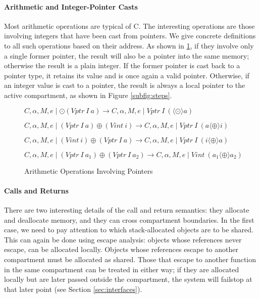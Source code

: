 \documentclass{article}
\begin{document}
\paragraph{Arithmetic and Integer-Pointer Casts}

Most arithmetic operations are typical of C. The interesting operations are those
involving integers that have been cast from pointers. We give concrete definitions
to all such operations based on their address. As shown in \ref{fig:arith}, if they
involve only a single former pointer, the result will also be a pointer into the
same memory; otherwise the result is a plain integer. If the former pointer is cast
back to a pointer type, it retains its value and is once again a valid pointer.
Otherwise, if an integer value is cast to a pointer, the result is always a local
pointer to the active compartment, as shown in Figure \ref{subfig:steps}.

\begin{figure}
  \judgment[Unop]
           {}
           {\(C,\alpha,M,e \mid \odot (\mathit{Vptr} ~ I ~ a) \longrightarrow
             C,\alpha,M,e \mid \mathit{Vptr} ~ I ~ (\langle \odot \rangle a)\)}
           
  \judgment[BinopPointerInteger]
           {}
           {\(C,\alpha,M,e \mid (\mathit{Vptr} ~ I ~ a) \oplus
             (\mathit{Vint} ~ i) \longrightarrow
             C,\alpha,M,e \mid \mathit{Vptr} ~ I ~ (a \langle \oplus \rangle i)\)}

  \judgment[BinopIntegerPointer]
           {}
           {\(C,\alpha,M,e \mid (\mathit{Vint} ~ i) \oplus
             (\mathit{Vptr} ~ I ~ a) \longrightarrow
           C,\alpha,M,e \mid \mathit{Vptr} ~ I ~ (i \langle \oplus \rangle a)\)}

  \judgment[BinopPointers]
           {}
           {\(C,\alpha,M,e \mid (\mathit{Vptr} ~ I ~ a_1) \oplus
             (\mathit{Vptr} ~ I ~ a_2) \longrightarrow
             C,\alpha,M,e \mid \mathit{Vint} ~ (a_1 \langle \oplus \rangle a_2)\)}

  \caption{Arithmetic Operations Involving Pointers}
  \label{fig:arith}
\end{figure}

\paragraph{Calls and Returns}

There are two interesting details of the call and return semantics:
they allocate and deallocate memory, and they can cross compartment boundaries.
In the first case, we need to pay attention to which stack-allocated
objects are to be shared. This can again be done using escape analysis:
objects whose references never escape, can be allocated locally. Objects whose
references escape to another compartment must be allocated as shared.
Those that escape to another function in the same compartment can be treated
in either way; if they are allocated locally but are later passed outside the
compartment, the system will failstop at that later point
(see Section \ref{sec:interfaces}).
\end{document}
